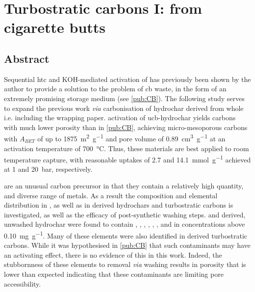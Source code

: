 \chapter{Turbostratic carbons I: from cigarette butts}
\label{ch:cbs}

\newpage
\section*{Abstract}

Sequential \gls{htc} and KOH-mediated activation of  has previously been shown by the author to provide a solution to the problem of \acrfull{cb} waste, in the form of an extremely promising  storage medium (see \ref{pub:CB}). The following study serves to expand the previous work \textit{via} carbonisation of \gls{hydrochar} derived from whole  i.e. including the wrapping paper.  activation of \acrshort{ucb}-\gls{hydrochar} yields carbons with much lower porosity than in \ref{pub:CB}, achieving micro-mesoporous carbons with $A_{BET}$ of up to \qty{1875}{\metre\squared\per\gram} and pore volume of \qty{0.89}{\cm\cubed\per\gram} at an activation temperature of \qty{700}{\degreeCelsius}. Thus, these materials are best applied to room temperature  capture, with reasonable uptakes of \num{2.7} and \qty{14.1}{\milli\mole\per\gram} achieved at 1 and \qty{20}{\bar}, respectively.

 are an unusual carbon precursor in that they contain a relatively high quantity, and diverse range of metals. As a result the composition and elemental distribution in , as well as in derived \glspl{hydrochar} and \glspl{turbostratic carbon} is investigated, as well as the efficacy of post-synthetic washing steps.  and derived, unwashed \gls{hydrochar} were found to contain , , , , , , and  in concentrations above \qty{0.10}{\mg\per\gram}. Many of these elements were also identified in derived \glspl{turbostratic carbon}. While it was hypothesised in \ref{pub:CB} that such contaminants may have an activating effect, there is no evidence of this in this work. Indeed, the stubbornness of these elements to removal \textit{via}  washing results in porosity that is lower than expected indicating that these contaminants are limiting pore accessibility.

\newpage

